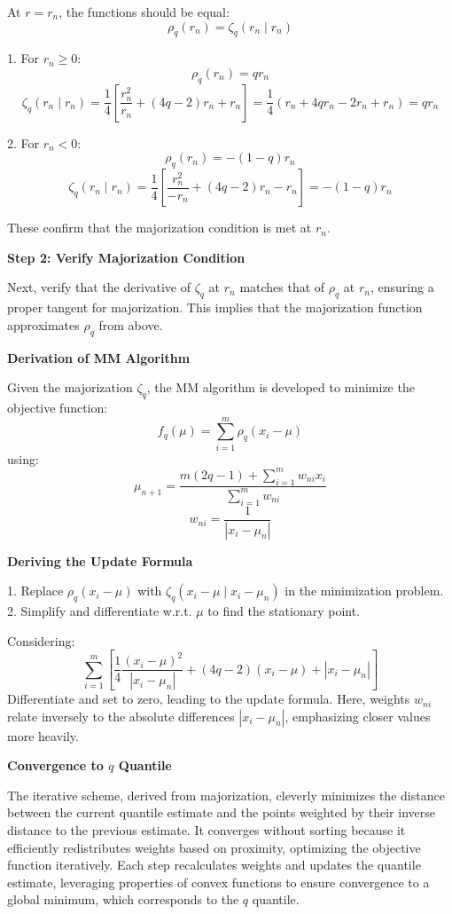 \documentclass[8pt]{article}
\begin{document}
{At \(r = r_n\), the functions should be equal:
\[
\rho_q(r_n) = \zeta_q(r_n \mid r_n)
\]

1. For \(r_n \geq 0\):
   \[
   \rho_q(r_n) = qr_n
   \]
   \[
   \zeta_q(r_n \mid r_n) = \frac{1}{4} \left[ \frac{r_n^2}{r_n} + (4q - 2)r_n + r_n \right] = \frac{1}{4} (r_n + 4qr_n - 2r_n + r_n) = qr_n
   \]

2. For \(r_n < 0\):
   \[
   \rho_q(r_n) = -(1-q)r_n
   \]
   \[
   \zeta_q(r_n \mid r_n) = \frac{1}{4} \left[ \frac{r_n^2}{-r_n} + (4q - 2)r_n - r_n \right] = -(1-q)r_n
   \]

These confirm that the majorization condition is met at \(r_n\).

\textbf{Step 2: Verify Majorization Condition}

Next, verify that the derivative of \(\zeta_q\) at \(r_n\) matches that of \(\rho_q\) at \(r_n\), ensuring a proper tangent for majorization. This implies that the majorization function approximates \(\rho_q\) from above.

\textbf{Derivation of MM Algorithm}

Given the majorization \(\zeta_q\), the MM algorithm is developed to minimize the objective function:
\[
f_q(\mu) = \sum_{i=1}^m \rho_q(x_i - \mu)
\]
using:
\[
\mu_{n+1} = \frac{m(2q - 1) + \sum_{i=1}^m w_{ni} x_i}{\sum_{i=1}^m w_{ni}}
\]
\[
w_{ni} = \frac{1}{|x_i - \mu_n|}
\]

\textbf{Deriving the Update Formula}

1. Replace \(\rho_q(x_i - \mu)\) with \(\zeta_q(x_i - \mu \mid x_i - \mu_n)\) in the minimization problem.
2. Simplify and differentiate w.r.t. \(\mu\) to find the stationary point.

Considering:
\[
\sum_{i=1}^m \left[\frac{1}{4} \frac{(x_i - \mu)^2}{|x_i - \mu_n|} + (4q - 2)(x_i - \mu) + |x_i - \mu_n|\right]
\]
Differentiate and set to zero, leading to the update formula. Here, weights \(w_{ni}\) relate inversely to the absolute differences \(|x_i - \mu_n|\), emphasizing closer values more heavily.

\textbf{Convergence to \(q\) Quantile}

The iterative scheme, derived from majorization, cleverly minimizes the distance between the current quantile estimate and the points weighted by their inverse distance to the previous estimate. It converges without sorting because it efficiently redistributes weights based on proximity, optimizing the objective function iteratively. Each step recalculates weights and updates the quantile estimate, leveraging properties of convex functions to ensure convergence to a global minimum, which corresponds to the \(q\) quantile.

}
\end{document}
